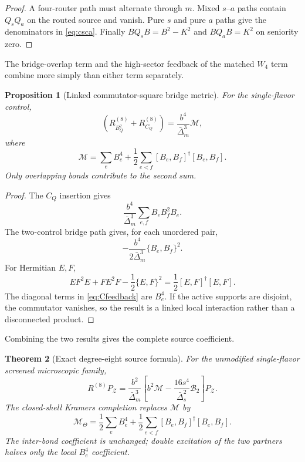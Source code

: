 \documentclass[11pt]{article}
\newtheorem{theorem}{Theorem}[section]
\newtheorem{proposition}[theorem]{Proposition}
\theoremstyle{definition}
\theoremstyle{remark}
\newcommand{\cZ}{\mathcal Z}
\newcommand{\cM}{\mathcal M}
\newcommand{\cB}{\mathcal B}
\begin{document}
\begin{proof}
A four-router path must alternate through $m$.  Mixed $s$--$a$ paths contain $Q_sQ_a$ on the routed source and vanish.  Pure $s$ and pure $a$ paths give the denominators in \eqref{eq:csca}.  Finally $B Q_sB=B^2-K^2$ and $BQ_aB=K^2$ on seniority zero.
\end{proof}

The bridge-overlap term and the high-sector feedback of the matched $W_4$ term combine more simply than either term separately.

\begin{proposition}[Linked commutator-square bridge metric]
\label{prop:M}
For the single-flavor control,
\begin{equation}
 \left(R_{B_Q^2}^{(8)}+R_{C_Q}^{(8)}\right)
 =\frac{b^4}{\bar\Delta_m^3}\cM,
 \label{eq:BCM}
\end{equation}
where
\begin{equation}
 \boxed{
 \cM=\sum_eB_e^4+\frac12\sum_{e<f}
 [B_e,B_f]^\dagger[B_e,B_f].}
 \label{eq:M}
\end{equation}
Only overlapping bonds contribute to the second sum.
\end{proposition}

\begin{proof}
The $C_Q$ insertion gives
\begin{equation}
 \frac{b^4}{\bar\Delta_m^3}\sum_{e,f}B_eB_f^2B_e.
 \label{eq:Cfeedback}
\end{equation}
The two-control bridge path gives, for each unordered pair,
\begin{equation}
 -\frac{b^4}{2\bar\Delta_m^3}\{B_e,B_f\}^2.
 \label{eq:overlap-pair}
\end{equation}
For Hermitian $E,F$,
\begin{equation}
 EF^2E+FE^2F-\frac12\{E,F\}^2
 =\frac12[E,F]^\dagger[E,F].
 \label{eq:comm-identity}
\end{equation}
The diagonal terms in \eqref{eq:Cfeedback} are $B_e^4$.  If the active supports are disjoint, the commutator vanishes, so the result is a linked local interaction rather than a disconnected product.
\end{proof}

Combining the two results gives the complete source coefficient.

\begin{theorem}[Exact degree-eight source formula]
\label{thm:source-formula}
For the unmodified single-flavor screened microscopic family,
\begin{equation}
 \boxed{
 R^{(8)}P_{\cZ}
 =\frac{b^2}{\bar\Delta_m^3}
 \left[b^2\cM-\frac{16s^4}{\bar\Delta_s^2}\cB_2\right]P_{\cZ}.}
 \label{eq:source-formula}
\end{equation}
The closed-shell Kramers completion replaces $\cM$ by
\begin{equation}
 \boxed{
 \cM_\Theta=\frac12\sum_eB_e^4+\frac12\sum_{e<f}
 [B_e,B_f]^\dagger[B_e,B_f].}
 \label{eq:Mtheta}
\end{equation}
The inter-bond coefficient is unchanged; double excitation of the two partners halves only the local $B_e^4$ coefficient.
\end{theorem}
\end{document}
